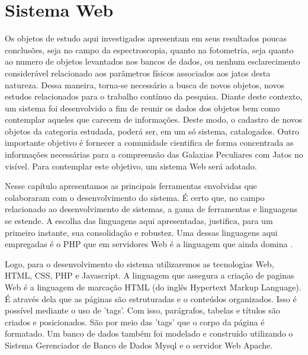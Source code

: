 \chapter{Sistema Web}

Os objetos de estudo aqui investigados apresentam em seus resultados poucas conclusões, seja no campo da espectroscopia, quanto na fotometria, seja quanto ao numero de objetos levantados nos bancos de dados, ou nenhum esclarecimento considerável relacionado aos parâmetros físicos associados aos jatos desta natureza. Dessa maneira, torna-se necessário a busca de novos objetos, novos estudos relacionados para o trabalho contínuo da pesquisa. Diante deste contexto, um sistema foi desenvolvido a fim de reunir os dados dos objetos bem como contemplar aqueles que carecem de informações. Deste modo, o cadastro de novos objetos da categoria estudada, poderá ser, em um só sistema, catalogados. Outro importante objetivo é fornecer a comunidade cientifica de forma concentrada as informações necessárias para a compreensão das Galaxias Peculiares com Jatos no visível. Para contemplar este objetivo, um sistema Web será adotado. 

Nesse capítulo apresentamos as principais ferramentas envolvidas que colaboraram com o desenvolvimento do sistema. É certo que, no campo relacionado ao desenvolvimento de sistemas, a gama de ferramentas e linguagens se estende. A escolha das linguagens aqui apresentadas, justifica, para um primeiro instante,  sua consolidação e robustez. Uma dessas linguagens aqui empregadas é o PHP que em servidores Web é a linguagem que ainda domina \cite{hills2013empirical}.

Logo, para o desenvolvimento do sistema utilizaremos as tecnologias Web, HTML, CSS, PHP e Javascript. A linguagem que assegura a criação de paginas Web é a linguagem de marcação HTML (do inglês Hypertext Markup Language). É através dela que as páginas são estruturadas e o conteúdos organizados. Isso é possível mediante o uso de 'tags'. Com isso, parágrafos, tabelas e títulos são criados e posicionados. São por meio das 'tags' que o corpo da página é formatado. Um banco de dados também foi modelado e construído utilizando o Sistema Gerenciador de Banco de Dados Mysql e o servidor Web Apache.


